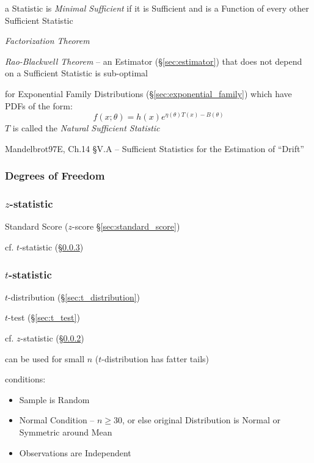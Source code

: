 a Statistic is \emph{Minimal Sufficient} if it is Sufficient and is a Function
of every other Sufficient Statistic

\emph{Factorization Theorem}

\emph{Rao-Blackwell Theorem} -- an Estimator (\S\ref{sec:estimator}) that does
not depend on a Sufficient Statistic is sub-optimal

for Exponential Family Distributions (\S\ref{sec:exponential_family}) which have
PDFs of the form:
\[
  f(x; \theta) = h(x) e^{\eta(\theta)T(x) - B(\theta)}
\]
$T$ is called the \emph{Natural Sufficient Statistic}

Mandelbrot97E, Ch.14 \S V.A -- Sufficient Statistics for the Estimation of
``Drift''



\subsubsection{Degrees of Freedom}\label{sec:statistical_freedom}

\subsubsection{$z$-statistic}\label{sec:z_statistic}

Standard Score ($z$-score \S\ref{sec:standard_score})

cf. $t$-statistic (\S\ref{sec:t_statistic})



\subsubsection{$t$-statistic}\label{sec:t_statistic}

$t$-distribution (\S\ref{sec:t_distribution})

$t$-test (\S\ref{sec:t_test})

cf. $z$-statistic (\S\ref{sec:z_statistic})

can be used for small $n$ ($t$-distribution has fatter tails)

conditions:
\begin{itemize}
  \item Sample is Random
  \item Normal Condition -- $n \geq 30$, or else original Distribution is Normal
    or Symmetric around Mean
  \item Observations are Independent
\end{itemize}

